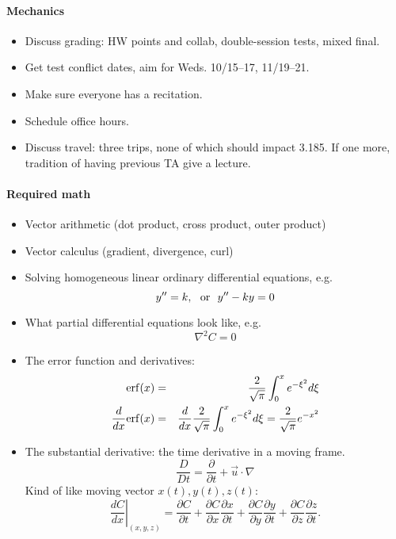 \documentclass{report}
\begin{document}
\paragraph{Mechanics}

\begin{itemize}
\item Discuss grading: HW points and collab, double-session tests, mixed final.
\item Get test conflict dates, aim for Weds. 10/15--17, 11/19--21.
\item Make sure everyone has a recitation.
\item Schedule office hours.
\item Discuss travel: three trips, none of which should impact 3.185.  If one
  more, tradition of having previous TA give a lecture.
\end{itemize}

\paragraph{Required math}
\begin{itemize}
\item Vector arithmetic (dot product, cross product, outer product)
\item Vector calculus (gradient, divergence, curl)
\item Solving homogeneous linear ordinary differential equations, e.g.
  \begin{equation}
    \label{eq:ODEs}
    y'' = k,\ \ {\rm or}\ \ y'' - ky = 0
  \end{equation}
\item What partial differential equations look like, e.g.
  \begin{equation}
    \label{eq:pdes}
    \nabla^2 C = 0
  \end{equation}
\item The error function and derivatives:
  \begin{eqnarray}
    \label{eq:erfdef}
    {\rm erf}(x) & = & \frac{2}{\sqrt{\pi}}\int_0^x e^{-\xi^2}d\xi \\
    \frac{d}{dx}{\rm erf}(x) & = &
    \frac{d}{dx}\frac{2}{\sqrt{\pi}}\int_0^x e^{-\xi^2}d\xi =
    \frac{2}{\sqrt{\pi}}e^{-x^2}
  \end{eqnarray}
\item The substantial derivative: the time derivative in a moving frame.
  \begin{equation}
    \label{eq:substantialdef}
    \frac{D}{Dt} = \frac{\partial}{\partial t} + \vec{u}\cdot\nabla
  \end{equation}
  Kind of like moving vector $x(t),y(t),z(t)$:
  \begin{equation}
    \label{eq:substantialexplan}
    \left.\frac{dC}{dx}\right|_{(x,y,z)} = \frac{\partial C}{\partial t} +
    \frac{\partial C}{\partial x}\frac{\partial x}{\partial t} +
    \frac{\partial C}{\partial y}\frac{\partial y}{\partial t} +
    \frac{\partial C}{\partial z}\frac{\partial z}{\partial t}.
  \end{equation}
\end{itemize}
\end{document}
